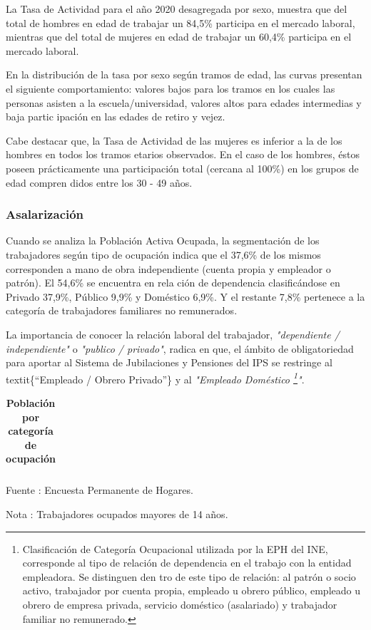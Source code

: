 La Tasa de Actividad para el año 2020 desagregada por sexo, muestra que
del total de hombres en edad de trabajar un 84,5\% participa en el
mercado laboral, mientras que del total de mujeres en edad de trabajar
un 60,4\% participa en el mercado laboral.

En la distribución de la tasa por sexo según tramos de edad, las curvas
presentan el siguiente comportamiento: valores bajos para los tramos en
los cuales las personas asisten a la escuela/universidad, valores altos
para edades intermedias y baja partic ipación en las edades de retiro y
vejez.

Cabe destacar que, la Tasa de Actividad de las mujeres es inferior a la
de los hombres en todos los tramos etarios observados. En el caso de los
hombres, éstos poseen prácticamente una participación total (cercana al
100\%) en los grupos de edad compren didos entre los 30 - 49 años.

\subsubsection{Asalarización}

Cuando se analiza la Población Activa Ocupada, la segmentación de los
trabajadores según tipo de ocupación indica que el 37,6\% de los mismos
corresponden a mano de obra independiente (cuenta propia y empleador o
patrón). El 54,6\% se encuentra en rela ción de dependencia
clasificándose en Privado 37,9\%, Público 9,9\% y Doméstico 6,9\%. Y el
restante 7,8\% pertenece a la categoría de trabajadores familiares no
remunerados.

La importancia de conocer la relación laboral del trabajador,
\textit{"dependiente / independiente"} o \textit{"publico / privado"},
radica en que, el ámbito de obligatoriedad para aportar al Sistema de
Jubilaciones y Pensiones del IPS se restringe al\\
textit\{``Empleado / Obrero Privado''\} y al
\textit{"Empleado Doméstico \footnote{Clasificación de Categoría Ocupacional utilizada por la EPH del INE, corresponde al tipo de relación de dependencia en el trabajo con la entidad empleadora. Se distinguen den
tro de este tipo de relación: al patrón o socio activo, trabajador por cuenta propia, empleado u obrero público, empleado u obrero de empresa privada, servicio doméstico (asalariado) y trabajador familiar no remunerado.}"}.

\begin{table}[H]
\begin{center}
\scriptsize
\caption{\bf{Población por categoría de ocupación}}
\begin{tabular}{l|rrrrrr}

\end{tabular}
                    \item \footnotesize Fuente : Encuesta Permanente de Hogares. 
                    \item \footnotesize Nota : Trabajadores ocupados mayores de 14 años.
\end{center}
\end{table}

